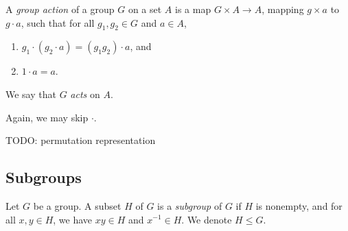     \begin{defn} \label{def_group_action}
        A \emph{group action} of a group $G$ on a set $A$ is a map $G \times A \to A$, mapping $g \times a$ to $g \cdot a$, such that for all $g_1,g_2 \in G$ and $a \in A$, \begin{enumerate}
            \item $g_1 \cdot (g_2 \cdot a) = (g_1g_2) \cdot a$, and
            \item $1 \cdot a = a$.
        \end{enumerate}
        We say that $G$ \emph{acts} on $A$.
    \end{defn}
    
    Again, we may skip $\cdot$.
    
    TODO: permutation representation
    
    \subsection{Subgroups}
    
    \begin{defn}[Subgroups] \label{def_subgroup}
        Let $G$ be a group. A subset $H$ of $G$ is a \emph{subgroup} of $G$ if $H$ is nonempty, and for all $x,y \in H$, we have $xy \in H$ and $x^{-1} \in H$. We denote $H \leq G$.
    \end{defn}


